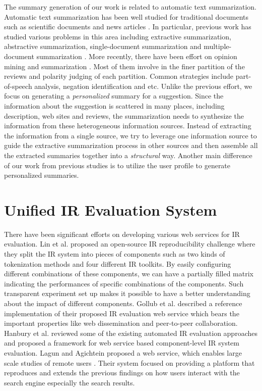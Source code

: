 The summary generation of our work is related to automatic text 
summarization. 
Automatic text summarization has been well studied for traditional 
documents such as scientific documents and news articles \cite{Radev:02}. 
In particular, previous work has studied various problems in this 
area including extractive summarization, abstractive summarization, 
single-document summarization and multiple-document summarization \cite{Das:07}. 
More recently, there have been effort on opinion mining and 
summarization \cite{Pang:2008:OMS:1454711.1454712,
Pak10, Pang:2004:SES:1218955.1218990,
mani1999advances,mani2001automatic,knight2002summarization,
ding2007utility,BACCIANELLA10.769,Chen:2010:AOM:1829879.1829923,
dey2009opinion,journals/sigir/Esuli08}. Most of them involve in the 
finer partition of the reviews and polarity judging of each partition. 
Common strategies include part-of-speech analysis, negation 
identification and etc. 
Unlike the previous effort, we focus on generating a 
{\em personalized} summary for a suggestion. 
Since the information about the suggestion is scattered in 
many places, including description, web sites 
and reviews, the summarization needs to synthesize the information 
from these heterogeneous information sources. Instead of 
extracting the information from a single source, we try to 
leverage one information source to guide the extractive 
summarization process in other sources and then assemble
all the extracted summaries together into a {\em structural} way.  
Another main difference of our work from previous studies is to 
utilize the user profile to generate personalized summaries.  

\section{Unified IR Evaluation System}

There have been significant efforts on developing various web 
services for IR evaluation. 
Lin et al. \cite{conf/ecir/LinCTCCFIMV16} proposed an open-source 
IR reproducibility challenge where they split the IR system into 
pieces of components such as two kinds of tokenization methods and 
four different IR toolkits. 
By easily configuring different combinations of these components, we 
can have a partially filled matrix indicating the performances of 
specific combinations of the components. Such transparent 
experiment set up makes it possible to have a better understanding about 
the impact of different components. 
Gollub et al. \cite{Gollub:2012:OIT:2348283.2348501} described a reference 
implementation of their proposed IR evaluation web service which bears 
the important properties like web dissemination and peer-to-peer 
collaboration. 
Hanbury et al. \cite{Hanbury:2010:ACE:1889174.1889194} reviewed some 
of the existing automated IR evaluation approaches and proposed a 
framework for web service based component-level IR system evaluation. 
Lagun and Agichtein proposed a web service, which enables large scale 
studies of remote users \cite{Lagun:2011:VEL:2009916.2009967}. 
Their system focused on providing a platform that reproduces and 
extends the previous findings on how users interact with the 
search engine especially the search results. 

